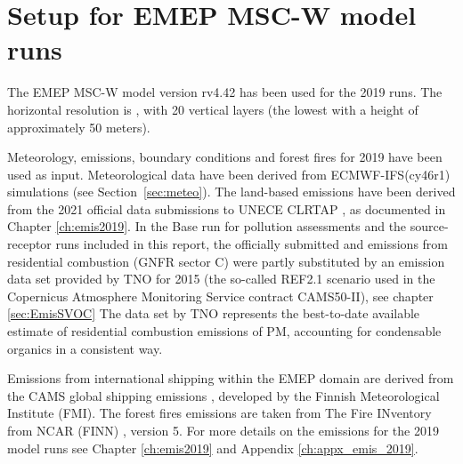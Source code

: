 \section{Setup for EMEP MSC-W model runs}
\label{Mod_2019}

The EMEP MSC-W model version rv4.42 has been used for the 2019
runs. The horizontal resolution is \resZO, with 20 vertical layers
(the lowest with a height of approximately 50 meters).

 Meteorology, emissions, boundary conditions and forest fires for 2019 have been
 used as input. Meteorological data have been
 derived from ECMWF-IFS(cy46r1) simulations (see Section~\ref{sec:meteo}). The
 land-based emissions have been derived from the 2021 official data
 submissions to UNECE CLRTAP \citep{CEIP2021}, as documented in
 Chapter \ref{ch:emis2019}. In the Base run for pollution assessments and the source-receptor runs included in this report, the officially submitted \PM[10] and \PM[2.5] emissions from residential combustion (GNFR sector C) were partly substituted by an emission data set provided by TNO for 2015 (the so-called REF2.1 scenario used in the Copernicus Atmosphere Monitoring Service contract CAMS50-II), see chapter \ref{sec:EmisSVOC} The data set by TNO represents the best-to-date available estimate of residential combustion emissions of PM, accounting for condensable organics in a consistent way. 
 
 Emissions from international shipping
 within the EMEP domain are derived from the CAMS global shipping
 emissions \citep{CAMSemis2019}, developed by the Finnish
 Meteorological Institute (FMI). The forest fires emissions are taken from
 The Fire INventory from NCAR (FINN) \citep{FINNIGAN1990}, version 5.
 For more details on the emissions for the 2019 model runs see Chapter
 \ref{ch:emis2019} and Appendix \ref{ch:appx_emis_2019}.


